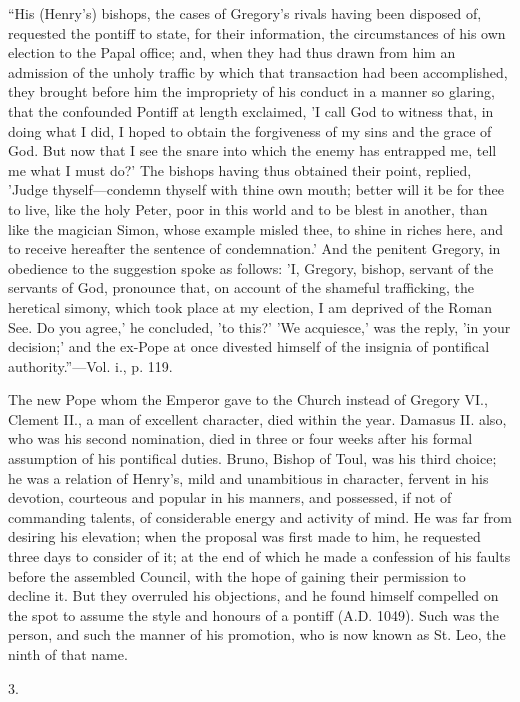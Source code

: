 ``His
(Henry's) bishops, the cases of Gregory's rivals having been disposed
of, requested the pontiff to state, for their information, the
circumstances of his own election to the Papal office; and, when they
had thus drawn from him an admission of the unholy traffic by which
that transaction had been accomplished, they brought before him the
impropriety of his conduct in a manner so glaring, that the confounded
Pontiff at length exclaimed, 'I call God to witness that, in doing
what I did, I hoped to obtain the forgiveness of my sins and the grace
of God. But now that I see the snare into which the enemy has
entrapped me, tell me what I must do?' The bishops having thus
obtained their point, replied, 'Judge thyself—condemn thyself with
thine own mouth; better will it be for thee to live, like the holy
Peter, poor in this world and to be blest in another, than like the
magician Simon, whose example misled thee, to shine in riches here,
and to receive hereafter the sentence of condemnation.' And the
penitent Gregory, in obedience to the suggestion spoke as follows: 'I,
Gregory, bishop, servant of the servants of God, pronounce that, on
account of the shameful trafficking, the heretical simony, which took
place at my election, I am deprived of the Roman See. Do you agree,'
he concluded, 'to this?' 'We acquiesce,' was the reply, 'in your
decision;' and the ex-Pope at once divested himself of the insignia of
pontifical authority.''—Vol. i., p. 119.

The new Pope whom the Emperor gave to the Church
instead of Gregory VI., Clement II., a man of excellent character,
died within the year. Damasus II. also, who was his second nomination,
died in three or four weeks after his formal assumption of his
pontifical duties. Bruno, Bishop of Toul, was his third choice; he was
a relation of Henry's, mild and unambitious in character,
fervent in his devotion, courteous and popular in his manners, and
possessed, if not of commanding talents, of considerable energy and
activity of mind. He was far from desiring his elevation; when the
proposal was first made to him, he requested three days to consider of
it; at the end of which he made a confession of his faults before the
assembled Council, with the hope of gaining their permission to
decline it. But they overruled his objections, and he found himself
compelled on the spot to assume the style and honours of a pontiff (A.D.
1049). Such was the person, and such the manner of his promotion, who
is now known as St. Leo, the ninth of that name.

3.

